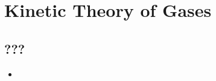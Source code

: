 \documentclass[../notes.tex]{subfiles}
\begin{document}
\chapter{Kinetic Theory of Gases}
\section{???}
\begin{itemize}
    \item {}
\end{itemize}
\end{document}
